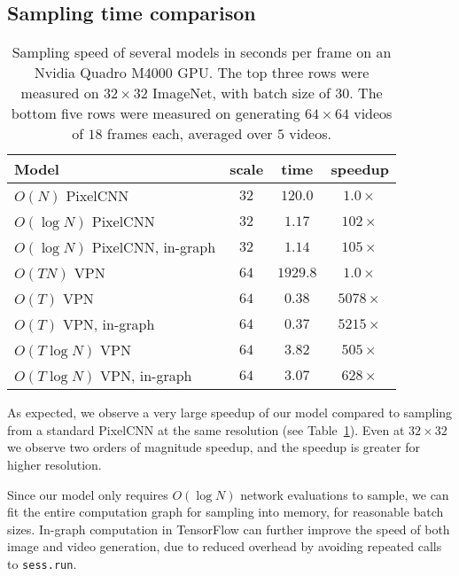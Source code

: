 \documentclass{article}
\begin{document}
\subsection{Sampling time comparison}
\begin{table}
\begin{center}
\begin{tabular}{| l | c |  c | c |}
\hline
\textbf{Model} & \textbf{scale} & \textbf{time} & \textbf{speedup} \\
\hline
\hline
\small{$O(N)$ PixelCNN} & $32$ & $120.0$ & $1.0 \times$ \\
\hline
\small{$O(\log N)$ PixelCNN} & $32$ & $1.17$ & $102 \times$ \\
\hline
\small{$O(\log N)$ PixelCNN}, in-graph & $32$ & $1.14$ & $105 \times$ \\
\hline
\hline
\small{$O(TN)$ VPN} & $64$ & $1929.8$ & $1.0 \times$\\
\hline
\small{$O(T)$ VPN} & $64$ & $0.38$ & $5078 \times$\\
\hline
\small{$O(T)$ VPN}, in-graph & $64$ & $0.37$ & $5215 \times$ \\
\hline
\small{$O(T \log N)$ VPN} & $64$ & $3.82$ & $505 \times$ \\
\hline
\small{$O(T \log N)$ VPN}, in-graph & $64$ & $3.07$ & $628 \times$\\
\hline
\end{tabular}
\end{center}
\vspace{-0.15in}
\caption{Sampling speed of several models in seconds per frame on an Nvidia Quadro M4000 GPU. The top three rows were measured on $32 \times 32$ ImageNet, with batch size of 30. The bottom five rows were measured on generating $64 \times 64$ videos of $18$ frames each, averaged over $5$ videos.\label{tab:speed}}
\vspace{-0.2in}
\end{table}


As expected, we observe a very large speedup of our model compared to sampling from a standard PixelCNN at the same resolution (see Table~\ref{tab:speed}).
Even at $32 \times 32$ we observe two orders of magnitude speedup, and the speedup is greater for higher resolution.


Since our model only requires $O(\log N)$ network evaluations to sample, we can fit the entire computation graph for sampling into memory, for reasonable batch sizes.
In-graph computation in TensorFlow can further improve the speed of both image and video generation, due to reduced overhead by avoiding repeated calls to \texttt{sess.run}.
\end{document}
